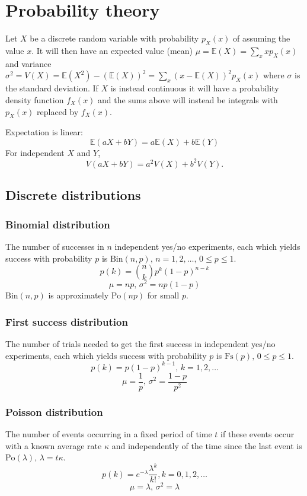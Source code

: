 \section{Probability theory}
Let $X$ be a discrete random variable with probability $p_X(x)$ of assuming the value $x$. It will then have an expected value (mean) $\mu=\mathbb{E}(X)=\sum_xxp_X(x)$ and variance $\sigma^2=V(X)=\mathbb{E}(X^2)-(\mathbb{E}(X))^2=\sum_x(x-\mathbb{E}(X))^2p_X(x)$ where $\sigma$ is the standard deviation. If $X$ is instead continuous it will have a probability density function $f_X(x)$ and the sums above will instead be integrals with $p_X(x)$ replaced by $f_X(x)$.

Expectation is linear:
\[\mathbb{E}(aX+bY) = a\mathbb{E}(X)+b\mathbb{E}(Y)\]
For independent $X$ and $Y$, \[V(aX+bY) = a^2V(X)+b^2V(Y).\]

\subsection{Discrete distributions}

\subsubsection{Binomial distribution}
The number of successes in $n$ independent yes/no experiments, each which yields success with probability $p$ is $\textrm{Bin}(n,p),\,n=1,2,\dots,\, 0\leq p\leq1$.
\[p(k)=\binom{n}{k}p^k(1-p)^{n-k}\]
\[\mu = np,\,\sigma^2=np(1-p)\]
$\textrm{Bin}(n,p)$ is approximately $\textrm{Po}(np)$ for small $p$.

\subsubsection{First success distribution}
The number of trials needed to get the first success in independent yes/no experiments, each which yields success with probability $p$ is $\textrm{Fs}(p),\,0\leq p\leq1$.
\[p(k)=p(1-p)^{k-1},\,k=1,2,\dots\]
\[\mu = \frac1p,\,\sigma^2=\frac{1-p}{p^2}\]

\subsubsection{Poisson distribution}
The number of events occurring in a fixed period of time $t$ if these events occur with a known average rate $\kappa$ and independently of the time since the last event is $\textrm{Po}(\lambda),\,\lambda=t\kappa$.
\[p(k)=e^{-\lambda}\frac{\lambda^k}{k!}, k=0,1,2,\dots\]
\[\mu=\lambda,\,\sigma^2=\lambda\]

